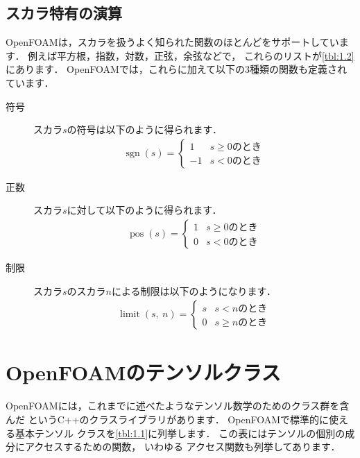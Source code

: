 \subsection{スカラ特有の演算}
\label{ssec:1.3.10}
OpenFOAMは，スカラを扱うよく知られた関数のほとんどをサポートしています．
例えば平方根，指数，対数，正弦，余弦などで，
これらのリストが\autoref{tbl:1.2}にあります．
OpenFOAMでは，これらに加えて以下の$3$種類の関数も定義されています．
\begin{description}
 \item[符号] スカラ$s$の符号は以下のように得られます．
            \begin{align}
             \label{eq:1.41}
             \mathop{\mathrm{sgn}}(s) =
             \begin{cases}
              1 & \text{$s \ge 0$のとき} \\
              -1 & \text{$s < 0$のとき}
             \end{cases}
            \end{align}
 \item[正数] スカラ$s$に対して以下のように得られます．
            \begin{align}
             \label{eq:1.42}
             \mathop{\mathrm{pos}}(s) =
             \begin{cases}
              1 & \text{$s \ge 0$のとき} \\
              0 & \text{$s < 0$のとき}
             \end{cases}
            \end{align}
 \item[制限] スカラ$s$のスカラ$n$による制限は以下のようになります．
            \begin{align}
             \label{eq:1.43}
             \mathop{\mathrm{limit}}(s,\ n) =
             \begin{cases}
              s & \text{$s < n$のとき} \\
              0 & \text{$s \ge n$のとき}
             \end{cases}
            \end{align}
\end{description}



\section{OpenFOAMのテンソルクラス}
\label{sec:1.4}
OpenFOAMには，これまでに述べたようなテンソル数学のためのクラス群を含んだ
%
%
というC++のクラスライブラリがあります．
OpenFOAMで標準的に使える基本テンソル
%
クラスを\autoref{tbl:1.1}に列挙します．
この表にはテンソルの個別の成分にアクセスするための関数，
いわゆる
%
アクセス関数も列挙してあります．



